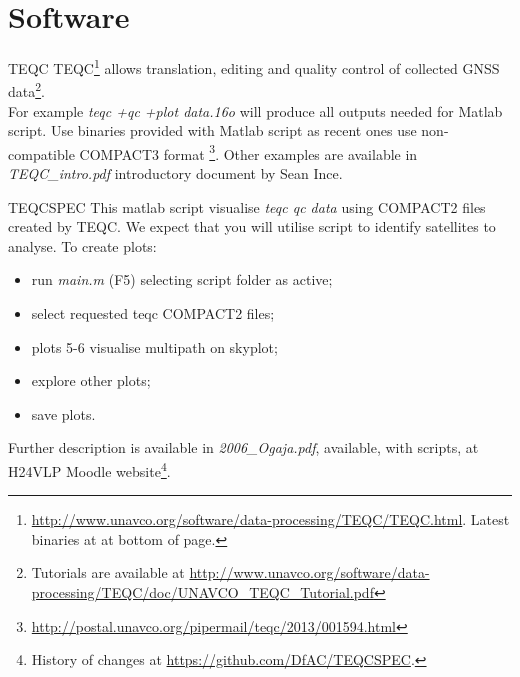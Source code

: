 \documentclass[11pt]{beamer}
\newcommand{\MatlabRef}{\footnote{History of changes at \url{https://github.com/DfAC/TEQCSPEC}.}}
\begin{document}
\section{Software}

	\begin{frame}{TEQC}
		TEQC\footnote{\url{http://www.unavco.org/software/data-processing/TEQC/TEQC.html}. Latest binaries at at bottom of page.} allows translation, editing and quality control of collected GNSS data\footnote{Tutorials are available at \url{http://www.unavco.org/software/data-processing/TEQC/doc/UNAVCO_TEQC_Tutorial.pdf}}. \\
		\medskip
		For example \alert{\textit{ teqc +qc +plot data.16o}} will produce all outputs needed for Matlab script. Use binaries provided with Matlab script as recent ones use non-compatible COMPACT3 format \footnote{\url{http://postal.unavco.org/pipermail/teqc/2013/001594.html}}. Other examples are available in \textit{TEQC\_intro.pdf} introductory document by Sean Ince.

	\end{frame}



	\begin{frame}{TEQCSPEC}
		This matlab script visualise \textit{teqc qc data} using COMPACT2 files created by TEQC. We expect that you will utilise script to identify satellites to analyse. To create plots:
		\begin{itemize}
			\item run \textit{main.m} (F5) selecting script folder as active;
			\item select requested teqc COMPACT2 files;
			\item plots 5-6 visualise multipath on skyplot;
			\item \textcolor{shadecolor}{explore other plots;}
			\item save plots.
		\end{itemize}

		Further description is available in \textit{2006\_Ogaja.pdf}, available, with scripts, at H24VLP Moodle website\MatlabRef.
	\end{frame}	
\end{document}

